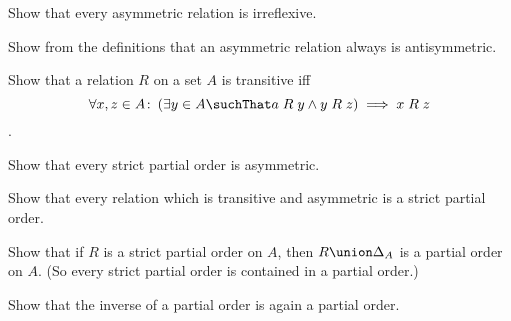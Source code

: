 \begin{Exercise} [number=20]
  Show that every asymmetric relation is irreflexive.
\end{Exercise}

\begin{Exercise} [number=22]
  Show from the definitions that an asymmetric relation always is
  antisymmetric.
\end{Exercise}

\begin{Exercise} [number=23]
  Show that a relation $R$ on a set $A$ is transitive
  iff \[\forall{x,z \in A} \colon \left( \exists{y \in A} \suchThat
    a \R y \land y \R z \right) \implies x \R z\].
\end{Exercise}

\begin{Exercise} [number=28]
  Show that every strict partial order is asymmetric.
\end{Exercise}

\begin{Exercise} [number=29]
  Show that every relation which is transitive and asymmetric is a
  strict partial order.
\end{Exercise}

\begin{Exercise} [number=30]
  Show that if $R$ is a strict partial order on $A$, then $R \union
  \Delta_A$ is a partial order on $A$. (So every strict partial order
  is contained in a partial order.)
\end{Exercise}

\begin{Exercise} [number=31]
  Show that the inverse of a partial order is again a partial order.
\end{Exercise}

